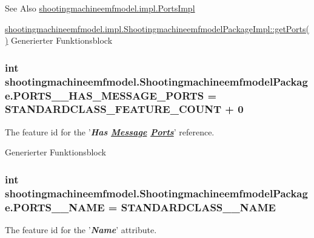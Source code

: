 \begin{DoxySeeAlso}{See Also}
\hyperlink{classshootingmachineemfmodel_1_1impl_1_1_ports_impl}{shootingmachineemfmodel.\-impl.\-Ports\-Impl} 

\hyperlink{classshootingmachineemfmodel_1_1impl_1_1_shootingmachineemfmodel_package_impl_ab434e3a5bfcdf490bed77881dae0841e}{shootingmachineemfmodel.\-impl.\-Shootingmachineemfmodel\-Package\-Impl\-::get\-Ports()} Generierter Funktionsblock 
\end{DoxySeeAlso}
\hypertarget{interfaceshootingmachineemfmodel_1_1_shootingmachineemfmodel_package_abfa26d954e44f83dadd22a364a5ede44}{
\subsubsection[{P\-O\-R\-T\-S\-\_\-\-\_\-\-H\-A\-S\-\_\-\-M\-E\-S\-S\-A\-G\-E\-\_\-\-P\-O\-R\-T\-S}]{\setlength{\rightskip}{0pt plus 5cm}int shootingmachineemfmodel.\-Shootingmachineemfmodel\-Package.\-P\-O\-R\-T\-S\-\_\-\-\_\-\-H\-A\-S\-\_\-\-M\-E\-S\-S\-A\-G\-E\-\_\-\-P\-O\-R\-T\-S = {\bf S\-T\-A\-N\-D\-A\-R\-D\-C\-L\-A\-S\-S\-\_\-\-F\-E\-A\-T\-U\-R\-E\-\_\-\-C\-O\-U\-N\-T} + 0}}\label{interfaceshootingmachineemfmodel_1_1_shootingmachineemfmodel_package_abfa26d954e44f83dadd22a364a5ede44}
The feature id for the '{\itshape {\bfseries Has \hyperlink{interfaceshootingmachineemfmodel_1_1_message}{Message} \hyperlink{interfaceshootingmachineemfmodel_1_1_ports}{Ports}}}' reference.

Generierter Funktionsblock  \hypertarget{interfaceshootingmachineemfmodel_1_1_shootingmachineemfmodel_package_a19c316778a7ed9961757b257c512945a}{
\subsubsection[{P\-O\-R\-T\-S\-\_\-\-\_\-\-N\-A\-M\-E}]{\setlength{\rightskip}{0pt plus 5cm}int shootingmachineemfmodel.\-Shootingmachineemfmodel\-Package.\-P\-O\-R\-T\-S\-\_\-\-\_\-\-N\-A\-M\-E = {\bf S\-T\-A\-N\-D\-A\-R\-D\-C\-L\-A\-S\-S\-\_\-\-\_\-\-N\-A\-M\-E}}}\label{interfaceshootingmachineemfmodel_1_1_shootingmachineemfmodel_package_a19c316778a7ed9961757b257c512945a}
The feature id for the '{\itshape {\bfseries Name}}' attribute.

